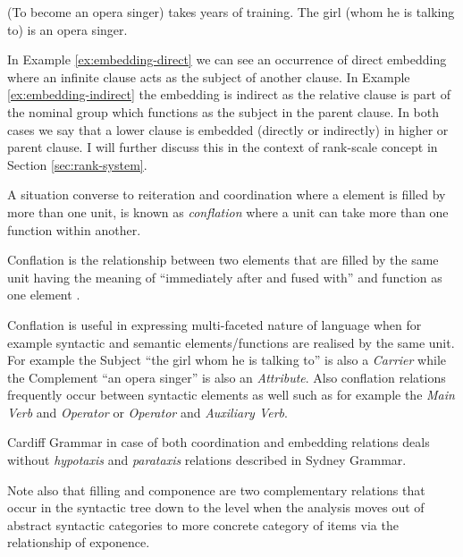 \begin{exe}
    \ex\label{ex:embedding-direct} (To become an opera singer) takes years of training.
    \ex\label{ex:embedding-indirect} The girl (whom he is talking to) is an opera singer.
\end{exe}

In Example \ref{ex:embedding-direct} we can see an occurrence of direct embedding where an infinite clause acts as the subject of another clause. In Example \ref{ex:embedding-indirect} the embedding is indirect as the relative clause is part of the nominal group which functions as the subject in the parent clause. In both cases we say that a lower clause is embedded (directly or indirectly) in higher or parent clause. I will further discuss this in the context of rank-scale concept in Section \ref{sec:rank-system}.

A situation converse to reiteration and coordination where a element is filled by more than one unit, is known as \textit{conflation} where a unit can take more than one function within another. 

\begin{definition}[Conflation]\label{def:conflation}
    Conflation is the relationship between two elements that are filled by the same unit having the meaning of ``immediately after and fused with'' and function as one element \citep[249--250]{Fawcett2000}. 
\end{definition}

Conflation is useful in expressing multi-faceted nature of language when for example syntactic and semantic elements/functions are realised by the same unit. For example the Subject ``the girl whom he is talking to'' is also a \textit{Carrier} while the Complement ``an opera singer'' is also an \textit{Attribute}. Also conflation relations frequently occur between syntactic elements as well such as for example the \textit{Main Verb} and \textit{Operator} or \textit{Operator} and \textit{Auxiliary Verb}.

Cardiff Grammar in case of both coordination and embedding relations deals without \textit{hypotaxis} and \textit{parataxis} relations described in Sydney Grammar.

%
Note also that filling and componence are two complementary relations that occur in the syntactic tree down to the level when the analysis moves out of abstract syntactic categories to more concrete category of items via the relationship of exponence.


